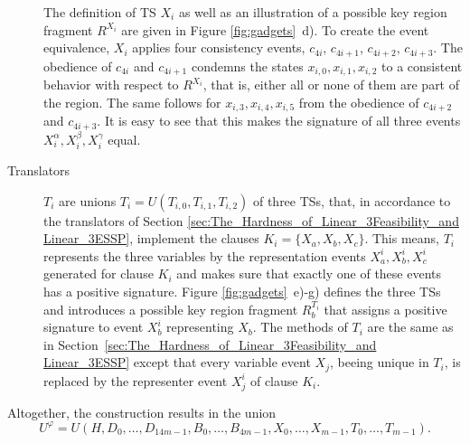\documentclass[english]{lipics_hacked}
\begin{document}
\begin{description}
The definition of TS $X_i$ as well as an illustration of a possible key region fragment $R^{X_i}$ are given in Figure \ref{fig:gadgets}~d).
To create the event equivalence, $X_i$ applies four consistency events, $c_{4i}$, $c_{4i+1}$, $c_{4i+2}$, $c_{4i+3}$.
The obedience of $c_{4i}$ and $c_{4i+1}$ condemns the states $x_{i,0}, x_{i,1}, x_{i,2}$ to a consistent behavior with respect to $R^{X_i}$, that is, either all or none of them are part of the region.
The same follows for $x_{i,3}, x_{i,4}, x_{i,5}$ from the obedience of $c_{4i+2}$ and $c_{4i+3}$.
It is easy to see that this makes the signature of all three events $X_i^\alpha, X_i^\beta, X_i^\gamma$ equal.
%
\item[Translators]
$T_i$ are unions $T_i = U(T_{i,0}, T_{i,1}, T_{i,2})$ of three TSs, that, in accordance to the translators of Section \ref{sec:The_Hardness_of_Linear_3Feasibility_and Linear_3ESSP}, implement the clauses $K_i = \{X_a, X_b, X_c\}$.
This means, $T_i$ represents the three variables by the representation events $X^i_a, X^i_b, X^i_c$ generated for clause $K_i$ and makes sure that exactly one of these events has a positive signature.
Figure \ref{fig:gadgets}~e)-g) defines the three TSs and introduces a possible key region fragment $R^{T_i}_b$ that assigns a positive signature to event $X^i_b$ representing $X_b$.
The methods of $T_i$ are the same as in Section~\ref{sec:The_Hardness_of_Linear_3Feasibility_and Linear_3ESSP} except that every variable event $X_j$, beeing unique in $T_i$, is replaced by the representer event $X^i_j$ of clause $K_i$.
%
\end{description}
%
Altogether, the construction results in the union
\[
U^\varphi = U(H, D_0, \dots, D_{14m-1}, B_0, \dots, B_{4m-1}, X_0, \dots, X_{m-1}, T_0, \dots, T_{m-1}).
\]
%
\end{document}
